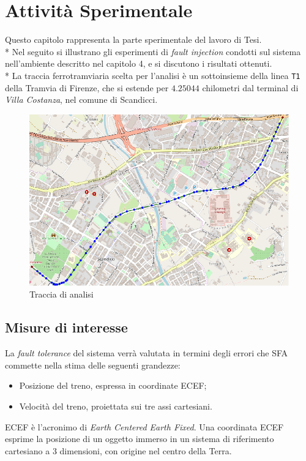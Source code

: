 \chapter{Attivit\`a Sperimentale}
Questo capitolo rappresenta la parte sperimentale del lavoro di Tesi.\\*
Nel seguito si illustrano gli esperimenti di \emph{fault injection} condotti sul sistema nell'ambiente descritto nel capitolo 4, e si discutono i risultati ottenuti.\\*
La traccia ferrotramviaria scelta per l'analisi \`e un sottoinsieme della linea \texttt{T1} della Tramvia di Firenze, che si estende per $4.25044$ chilometri dal terminal di \emph{Villa Costanza}, nel comune di Scandicci. 
\begin{figure}[h]
	\centering
	\includegraphics[width=0.7\linewidth]{img/itrace}
	\caption{Traccia di analisi}
	\label{fig:linea-test}
\end{figure}
\section{Misure di interesse}
La \emph{fault tolerance} del sistema verr\`a valutata in termini degli errori che SFA commette nella stima delle seguenti grandezze:
\begin{itemize}
	\item Posizione del treno, espressa in coordinate ECEF;
	\item Velocit\`a del treno, proiettata sui tre assi cartesiani.
\end{itemize}
ECEF \`e l'acronimo di \emph{Earth Centered Earth Fixed}. Una coordinata ECEF esprime la posizione di un oggetto immerso in un sistema di riferimento cartesiano a 3 dimensioni, con origine nel centro della Terra.
